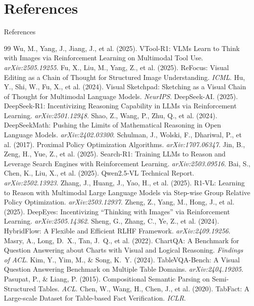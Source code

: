 \documentclass[aspectratio=169]{beamer}
\begin{document}
\section{References}
\begin{frame}[allowframebreaks]{References}
  \scriptsize
  \begin{thebibliography}{99}
   Wu, M., Yang, J., Jiang, J., et al. (2025). VTool-R1: VLMs Learn to Think with Images via Reinforcement Learning on Multimodal Tool Use. \emph{arXiv:2505.19255}.
   Fu, X., Liu, M., Yang, Z., et al. (2025). ReFocus: Visual Editing as a Chain of Thought for Structured Image Understanding. \emph{ICML}.
   Hu, Y., Shi, W., Fu, X., et al. (2024). Visual Sketchpad: Sketching as a Visual Chain of Thought for Multimodal Language Models. \emph{NeurIPS}.
   DeepSeek-AI. (2025). DeepSeek-R1: Incentivizing Reasoning Capability in LLMs via Reinforcement Learning. \emph{arXiv:2501.12948}.
   Shao, Z., Wang, P., Zhu, Q., et al. (2024). DeepSeekMath: Pushing the Limits of Mathematical Reasoning in Open Language Models. \emph{arXiv:2402.03300}.
   Schulman, J., Wolski, F., Dhariwal, P., et al. (2017). Proximal Policy Optimization Algorithms. \emph{arXiv:1707.06347}.
   Jin, B., Zeng, H., Yue, Z., et al. (2025). Search-R1: Training LLMs to Reason and Leverage Search Engines with Reinforcement Learning. \emph{arXiv:2503.09516}.
   Bai, S., Chen, K., Liu, X., et al. (2025). Qwen2.5-VL Technical Report. \emph{arXiv:2502.13923}.
   Zhang, J., Huang, J., Yao, H., et al. (2025). R1-VL: Learning to Reason with Multimodal Large Language Models via Step-wise Group Relative Policy Optimization. \emph{arXiv:2503.12937}.
   Zheng, Z., Yang, M., Hong, J., et al. (2025). DeepEyes: Incentivizing ``Thinking with Images'' via Reinforcement Learning. \emph{arXiv:2505.14362}.
   Sheng, G., Zhang, C., Ye, Z., et al. (2024). HybridFlow: A Flexible and Efficient RLHF Framework. \emph{arXiv:2409.19256}.
   Masry, A., Long, D.~X., Tan, J.~Q., et al. (2022). ChartQA: A Benchmark for Question Answering about Charts with Visual and Logical Reasoning. \emph{Findings of ACL}.
   Kim, Y., Yim, M., \& Song, K.~Y. (2024). TableVQA-Bench: A Visual Question Answering Benchmark on Multiple Table Domains. \emph{arXiv:2404.19205}.
   Pasupat, P., \& Liang, P. (2015). Compositional Semantic Parsing on Semi-Structured Tables. \emph{ACL}.
   Chen, W., Wang, H., Chen, J., et al. (2020). TabFact: A Large-scale Dataset for Table-based Fact Verification. \emph{ICLR}.
  \end{thebibliography}
\end{frame}
\end{document}
